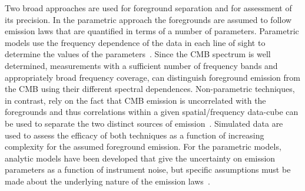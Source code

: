 \documentclass[PICOReport.tex]{subfiles}
\begin{document}
Two broad approaches are used for foreground separation and for assessment of its precision.  In the parametric approach the foregrounds are assumed to follow emission laws that are quantified in terms of a number of parameters. Parametric
models use the frequency dependence of the data in each line of sight to determine the values of the parameters~\citep{eriksen/etal:2008}.  Since the CMB spectrum is well determined, measurements with a sufficient number of frequency bands and appropriately broad frequency coverage, can distinguish foreground emission from the CMB using their different spectral dependences. Non-parametric techniques, in contrast, rely on the fact that CMB emission is uncorrelated with the foregrounds and thus correlations within a given spatial/frequency data-cube can be used to separate the two distinct sources of emission~\citep{nilc,gnilc}.  Simulated data are used to assess the efficacy of both techniques as a function of increasing complexity for the assumed foreground emission. For the parametric models, analytic models have been developed that give the uncertainty on emission parameters as a function of instrument noise, but specific assumptions must be made about the underlying nature of the emission laws~\citep{errard_and_finney}. 

\end{document}
